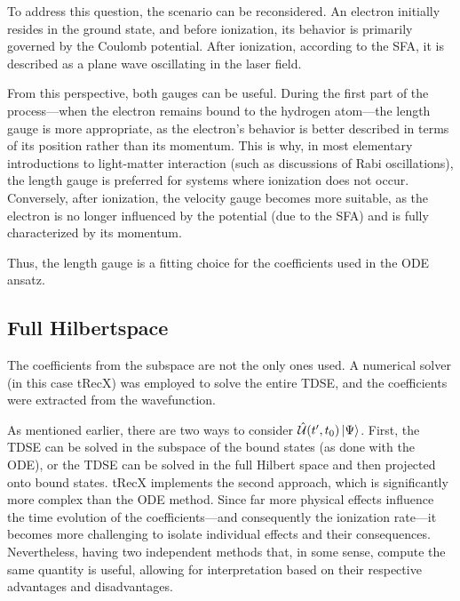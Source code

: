 To address this question, the scenario can be reconsidered.
An electron initially resides in the ground state, and before ionization, its behavior is primarily governed by the Coulomb potential.
After ionization, according to the SFA, it is described as a plane wave oscillating in the laser field.

From this perspective, both gauges can be useful.
During the first part of the process—when the electron remains bound to the hydrogen atom—the length gauge is more appropriate, as the electron's behavior is better described in terms of its position rather than its momentum.
This is why, in most elementary introductions to light-matter interaction (such as discussions of Rabi oscillations), the length gauge is preferred for systems where ionization does not occur.
Conversely, after ionization, the velocity gauge becomes more suitable, as the electron is no longer influenced by the potential (due to the SFA) and is fully characterized by its momentum.

Thus, the length gauge is a fitting choice for the coefficients used in the ODE ansatz.









\subsection{Full Hilbertspace}
The coefficients from the subspace are not the only ones used. A numerical solver (in this case tRecX) was employed to solve the entire TDSE, and the coefficients were extracted from the wavefunction.

As mentioned earlier, there are two ways to consider $\hat{\mathcal{U}}(t',t_0)\ket{\Psi}$.
First, the TDSE can be solved in the subspace of the bound states (as done with the ODE), or the TDSE can be solved in the full Hilbert space and then projected onto bound states.
tRecX implements the second approach, which is significantly more complex than the ODE method.
Since far more physical effects influence the time evolution of the coefficients—and consequently the ionization rate—it becomes more challenging to isolate individual effects and their consequences.
Nevertheless, having two independent methods that, in some sense, compute the same quantity is useful, allowing for interpretation based on their respective advantages and disadvantages.

